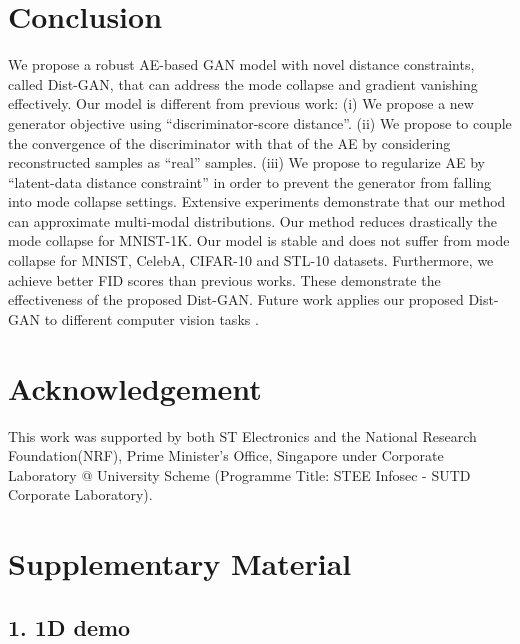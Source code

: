 \documentclass[runningheads]{llncs}
\begin{document}
 
\section{Conclusion}

We propose a robust AE-based GAN model with novel distance constraints, called Dist-GAN, that can address the mode collapse and gradient vanishing effectively. Our model is different from previous work: (i) We propose a new generator objective using ``discriminator-score distance''. (ii) We propose to couple the convergence of the discriminator with that of the AE by considering reconstructed samples as ``real'' samples. (iii) We propose to  regularize AE by ``latent-data distance constraint'' in order to  prevent the generator from falling into mode collapse settings. Extensive experiments demonstrate that our method can approximate multi-modal distributions. Our method reduces drastically the mode collapse for MNIST-1K. Our model is stable and does not suffer from mode collapse for MNIST, CelebA, CIFAR-10 and STL-10 datasets. Furthermore, we achieve better FID scores than previous works. These demonstrate the effectiveness of the proposed Dist-GAN. Future work applies our proposed Dist-GAN to different computer vision tasks \cite{hoang-acmm-2017,yiluan-cvpr-2018}. 
\section*{Acknowledgement}

This work was supported by both ST Electronics and the National Research Foundation(NRF), Prime Minister's Office, Singapore under Corporate Laboratory @ University Scheme (Programme Title: STEE Infosec - SUTD Corporate Laboratory). 
\clearpage






\section*{Supplementary Material}

\subsection*{1. 1D demo}
\end{document}
